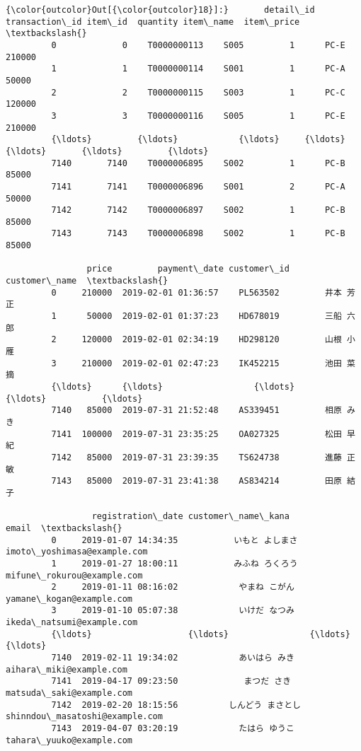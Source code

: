 \documentclass[11pt]{article}
\begin{document}
\begin{Verbatim}[commandchars=\\\{\}]
{\color{outcolor}Out[{\color{outcolor}18}]:}       detail\_id transaction\_id item\_id  quantity item\_name  item\_price  \textbackslash{}
         0             0    T0000000113    S005         1      PC-E      210000   
         1             1    T0000000114    S001         1      PC-A       50000   
         2             2    T0000000115    S003         1      PC-C      120000   
         3             3    T0000000116    S005         1      PC-E      210000   
         {\ldots}         {\ldots}            {\ldots}     {\ldots}       {\ldots}       {\ldots}         {\ldots}   
         7140       7140    T0000006895    S002         1      PC-B       85000   
         7141       7141    T0000006896    S001         2      PC-A       50000   
         7142       7142    T0000006897    S002         1      PC-B       85000   
         7143       7143    T0000006898    S002         1      PC-B       85000   
         
                price         payment\_date customer\_id customer\_name  \textbackslash{}
         0     210000  2019-02-01 01:36:57    PL563502         井本 芳正   
         1      50000  2019-02-01 01:37:23    HD678019         三船 六郎   
         2     120000  2019-02-01 02:34:19    HD298120         山根 小雁   
         3     210000  2019-02-01 02:47:23    IK452215         池田 菜摘   
         {\ldots}      {\ldots}                  {\ldots}         {\ldots}           {\ldots}   
         7140   85000  2019-07-31 21:52:48    AS339451         相原 みき   
         7141  100000  2019-07-31 23:35:25    OA027325         松田 早紀   
         7142   85000  2019-07-31 23:39:35    TS624738         進藤 正敏   
         7143   85000  2019-07-31 23:41:38    AS834214         田原 結子   
         
                 registration\_date customer\_name\_kana                           email  \textbackslash{}
         0     2019-01-07 14:34:35           いもと よしまさ     imoto\_yoshimasa@example.com   
         1     2019-01-27 18:00:11           みふね ろくろう      mifune\_rokurou@example.com   
         2     2019-01-11 08:16:02            やまね こがん        yamane\_kogan@example.com   
         3     2019-01-10 05:07:38            いけだ なつみ       ikeda\_natsumi@example.com   
         {\ldots}                   {\ldots}                {\ldots}                             {\ldots}   
         7140  2019-02-11 19:34:02            あいはら みき         aihara\_miki@example.com   
         7141  2019-04-17 09:23:50             まつだ さき        matsuda\_saki@example.com   
         7142  2019-02-20 18:15:56          しんどう まさとし  shinndou\_masatoshi@example.com   
         7143  2019-04-07 03:20:19            たはら ゆうこ        tahara\_yuuko@example.com   
         

\end{Verbatim}
\end{document}
